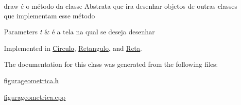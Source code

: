 draw é o método da classe Abstrata que ira desenhar objetos de outras classes que implementam esse método 


\begin{DoxyParams}{Parameters}
{\em t} & é a tela na qual se deseja desenhar \\
\hline
\end{DoxyParams}


Implemented in \hyperlink{class_circulo_a593787d6e0618c2eded23e8839e7bea6}{Circulo}, \hyperlink{class_retangulo_ac088dd6d3f4f3d3f80363a868c2e74f1}{Retangulo}, and \hyperlink{class_reta_ac2e9805183cd474b62bffd8b032cd780}{Reta}.



The documentation for this class was generated from the following files\+:\begin{DoxyCompactItemize}
\item 
\hyperlink{figurageometrica_8h}{figurageometrica.\+h}\item 
\hyperlink{figurageometrica_8cpp}{figurageometrica.\+cpp}\end{DoxyCompactItemize}

